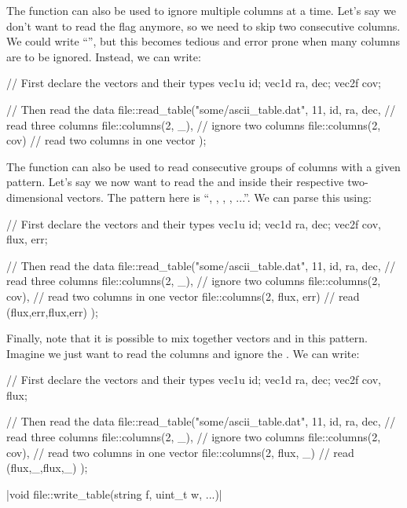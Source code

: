 The  function can also be used to ignore multiple columns at a time. Let's say we don't want to read the  flag anymore, so we need to skip two consecutive columns. We could write ``\cppinline{_, _}'', but this becomes tedious and error prone when many columns are to be ignored. Instead, we can write:
\begin{cppcode}
// First declare the vectors and their types
vec1u id;
vec1d ra, dec;
vec2f cov;

// Then read the data
file::read_table("some/ascii_table.dat", 11,
    id, ra, dec,          // read three columns
    file::columns(2, _),  // ignore two columns
    file::columns(2, cov) // read two columns in one vector
);
\end{cppcode}

The  function can also be used to read consecutive groups of columns with a given pattern. Let's say we now want to read the  and  inside their respective two-dimensional vectors. The pattern here is ``, , , , ...''. We can parse this using:
\begin{cppcode}
// First declare the vectors and their types
vec1u id;
vec1d ra, dec;
vec2f cov, flux, err;

// Then read the data
file::read_table("some/ascii_table.dat", 11,
    id, ra, dec,           // read three columns
    file::columns(2, _),   // ignore two columns
    file::columns(2, cov), // read two columns in one vector
    file::columns(2, flux, err) // read (flux,err,flux,err)
);
\end{cppcode}

Finally, note that it is possible to mix together vectors and \cppinline{_} in this pattern. Imagine we just want to read the  columns and ignore the . We can write:
\begin{cppcode}
// First declare the vectors and their types
vec1u id;
vec1d ra, dec;
vec2f cov, flux;

// Then read the data
file::read_table("some/ascii_table.dat", 11,
    id, ra, dec,           // read three columns
    file::columns(2, _),   // ignore two columns
    file::columns(2, cov), // read two columns in one vector
    file::columns(2, flux, _) // read (flux,_,flux,_)
);
\end{cppcode}

\item \cppinline|void file::write_table(string f, uint_t w, ...)| 


